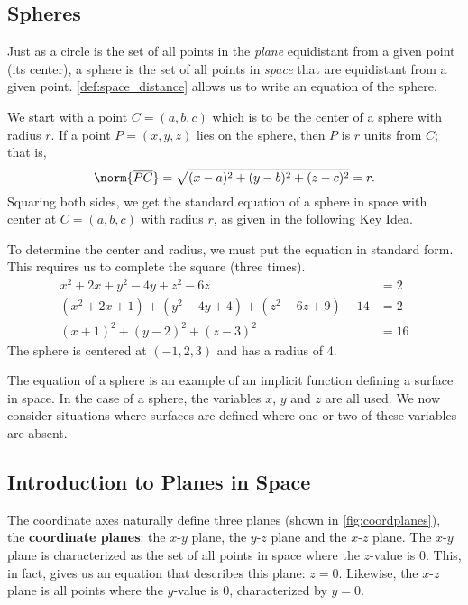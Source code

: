 \subsection*{Spheres}

Just as a circle is the set of all points in the \textit{plane} equidistant from a given point (its center), a sphere is the set of all points in \textit{space} that are equidistant from a given point. \autoref{def:space_distance} allows us to write an equation of the sphere.

We start with a point $C = (a,b,c)$ which is to be the center of a sphere with radius $r$. If a point $P=(x,y,z)$ lies on the sphere, then $P$ is $r$ units from $C$; that is, 
$$\norm{\overline{PC}}= \sqrt{(x-a)^2+(y-b)^2+(z-c)^2} = r.$$
Squaring both sides, we get the standard equation of a sphere in space with center at $C=(a,b,c)$ with radius $r$, as given in the following Key Idea.


{To determine the center and radius, we must put the equation in standard form. This requires us to complete the square (three times).
\begin{align*}
x^2+2x+y^2-4y+z^2-6z&=2 \\
(x^2+2x+1) + (y^2-4y+4)+ (z^2-6z+9) - 14 &= 2\\
(x+1)^2 + (y-2)^2 + (z-3)^2 &= 16
\end{align*}
The sphere is centered at $(-1,2,3)$ and has a radius of 4.}

The equation of a sphere is an example of an implicit function defining a surface in space. In the case of a sphere, the variables $x$, $y$ and $z$ are all used. We now consider situations where surfaces are defined where one or two of these variables are absent.

\subsection*{Introduction to Planes in Space}

The coordinate axes naturally define three planes (shown in \autoref{fig:coordplanes}), the \textbf{coordinate planes}: the $x$-$y$ plane, the $y$-$z$ plane and the $x$-$z$ plane. The $x$-$y$ plane is characterized as the set of all points in space where the $z$-value is 0. %
This, in fact, gives us an equation that describes this plane: $z=0$. Likewise, the $x$-$z$ plane is all points where the $y$-value is 0, characterized by $y=0$.\\

